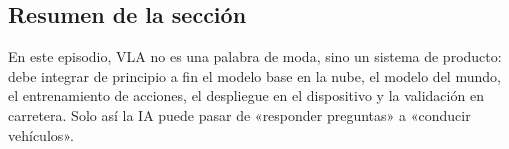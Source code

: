 \subsection{Resumen de la sección}

En este episodio, VLA no es una palabra de moda, sino un sistema de producto: debe integrar de principio a fin el modelo base en la nube, el modelo del mundo, el entrenamiento de acciones, el despliegue en el dispositivo y la validación en carretera. Solo así la IA puede pasar de «responder preguntas» a «conducir vehículos».
